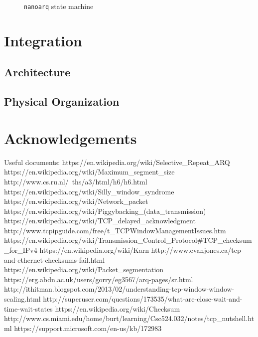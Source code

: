 \documentclass[11pt]{article}
\newcommand{\nanoarq}{\texttt{nanoarq}}
\begin{document}
\begin{figure}[H]
\caption{\nanoarq{} state machine}
\label{fig:state-machine}
\end{figure}

\section{Integration}
\subsection{Architecture}
\subsection{Physical Organization}
\section{Acknowledgements}
Useful documents:
https://en.wikipedia.org/wiki/Selective_Repeat_ARQ
https://en.wikipedia.org/wiki/Maximum_segment_size
http://www.cs.ru.nl/~ths/a3/html/h6/h6.html
https://en.wikipedia.org/wiki/Silly_window_syndrome
https://en.wikipedia.org/wiki/Network_packet
https://en.wikipedia.org/wiki/Piggybacking_(data_transmission)
https://en.wikipedia.org/wiki/TCP_delayed_acknowledgment
http://www.tcpipguide.com/free/t_TCPWindowManagementIssues.htm
https://en.wikipedia.org/wiki/Transmission_Control_Protocol#TCP_checksum_for_IPv4
https://en.wikipedia.org/wiki/Karn%
http://www.evanjones.ca/tcp-and-ethernet-checksums-fail.html
https://en.wikipedia.org/wiki/Packet_segmentation
https://erg.abdn.ac.uk/users/gorry/eg3567/arq-pages/sr.html
http://ithitman.blogspot.com/2013/02/understanding-tcp-window-window-scaling.html
http://superuser.com/questions/173535/what-are-close-wait-and-time-wait-states
https://en.wikipedia.org/wiki/Checksum
http://www.cs.miami.edu/home/burt/learning/Csc524.032/notes/tcp_nutshell.html
https://support.microsoft.com/en-us/kb/172983
\end{document}
